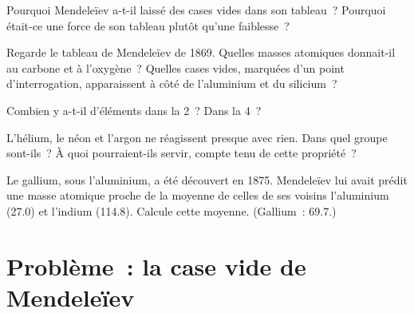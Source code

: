 \begin{exercise}[$\star\star$]\label{exo:g9:periodic-table-first-look:8}
Pourquoi Mendeleïev a-t-il laissé des cases vides dans son tableau~?
Pourquoi était-ce une force de son tableau plutôt qu'une faiblesse~?
\end{exercise}

\begin{exercise}[$\star\star$]\label{exo:g9:periodic-table-first-look:9}
Regarde le tableau de Mendeleïev de 1869. Quelles masses atomiques
donnait-il au carbone et à l'oxygène~? Quelles cases vides, marquées
d'un point d'interrogation, apparaissent à côté de l'aluminium et du
silicium~?
\end{exercise}

\begin{exercise}[$\star\star$]\label{exo:g9:periodic-table-first-look:10}
Combien y a-t-il d'éléments dans la  2~? Dans la  4~?
\end{exercise}

\begin{exercise}[$\star\star\star$]\label{exo:g9:periodic-table-first-look:11}
L'hélium, le néon et l'argon ne réagissent presque avec rien. Dans quel
groupe sont-ils~? À quoi pourraient-ils servir, compte tenu de cette
propriété~?
\end{exercise}

\begin{exercise}[$\star\star\star$]\label{exo:g9:periodic-table-first-look:12}
Le gallium, sous l'aluminium, a été découvert en 1875. Mendeleïev lui
avait prédit une masse atomique proche de la moyenne de celles de ses
voisins l'aluminium (27.0) et l'indium (114.8). Calcule cette moyenne.
(Gallium~: 69.7.)
\end{exercise}

\section{Problème~: la case vide de Mendeleïev}

